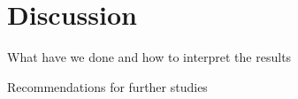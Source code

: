 \section{Discussion}
	

What have we done and how to interpret the results

Recommendations for further studies
